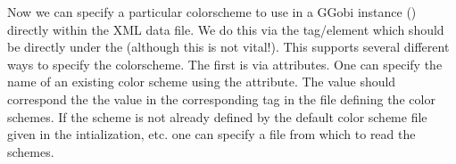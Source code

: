 \documentclass{article}
\begin{document}
Now we can specify a particular colorscheme to use in a GGobi instance
() directly within the XML data file.  We do this via
the  tag/element which should be directly
under the  (although this is not vital!).  This
supports several different ways to specify the colorscheme.  The first
is via attributes.  One can specify the name of an existing color
scheme using the  attribute.  The value should
correspond the the  value in the corresponding
 tag in the file defining the color schemes.  If
the scheme is not already defined by the default color scheme file
given in the intialization, etc.  one can specify a file from which to
read the schemes.
\end{document}
